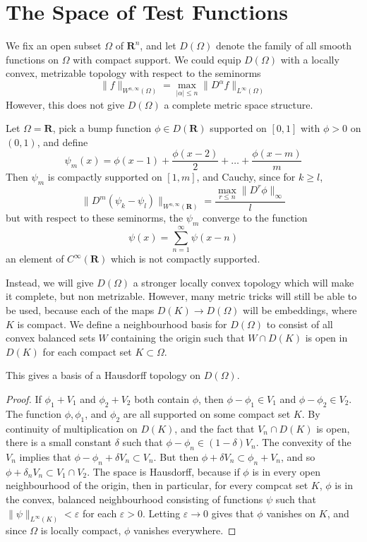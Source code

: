 \section{The Space of Test Functions}

We fix an open subset $\Omega$ of $\mathbf{R}^n$, and let $D(\Omega)$ denote the family of all smooth functions on $\Omega$ with compact support. We could equip $D(\Omega)$ with a locally convex, metrizable topology with respect to the seminorms
%
\[ \| f \|_{W^{n,\infty}(\Omega)} = \max_{|\alpha| \leq n} \| D^\alpha f \|_{L^\infty(\Omega)} \]
%
However, this does not give $D(\Omega)$ a complete metric space structure.

\begin{example}
    Let $\Omega = \mathbf{R}$, pick a bump function $\phi \in D(\mathbf{R})$ supported on $[0,1]$ with $\phi > 0$ on $(0,1)$, and define
    \[ \psi_m(x) = \phi(x-1) + \frac{\phi(x-2)}{2} + \dots + \frac{\phi(x-m)}{m} \]
    Then $\psi_m$ is compactly supported on $[1,m]$, and Cauchy, since for $k \geq l$,
    \[ \| D^m (\psi_k - \psi_l) \|_{W^{n,\infty}(\mathbf{R})} = \frac{ \max_{r \leq n} \| D^r \phi \|_\infty}{l} \]
    but with respect to these seminorms, the $\psi_m$ converge to the function
    \[ \psi(x) = \sum_{n = 1}^\infty \psi(x-n) \]
    an element of $C^\infty(\mathbf{R})$ which is not compactly supported.
\end{example}

Instead, we will give $D(\Omega)$ a stronger locally convex topology which will make it complete, but non metrizable. However, many metric tricks will still be able to be used, because each of the maps $D(K) \to D(\Omega)$ will be embeddings, where $K$ is compact. We define a neighbourhood basis for $D(\Omega)$ to consist of all convex balanced sets $W$ containing the origin such that $W \cap D(K)$ is open in $D(K)$ for each compact set $K \subset \Omega$.

\begin{theorem}
    This gives a basis of a Hausdorff topology on $D(\Omega)$.
\end{theorem}
\begin{proof}
    If $\phi_1 + V_1$ and $\phi_2 + V_2$ both contain $\phi$, then $\phi - \phi_1 \in V_1$ and $\phi - \phi_2 \in V_2$. The function $\phi, \phi_1$, and $\phi_2$ are all supported on some compact set $K$. By continuity of multiplication on $D(K)$, and the fact that $V_n \cap D(K)$ is open, there is a small constant $\delta$ such that $\phi - \phi_n \in (1 - \delta) V_n$. The convexity of the $V_n$ implies that $\phi - \phi_n + \delta V_n \subset V_n$. But then $\phi + \delta V_n \subset \phi_n + V_n$, and so $\phi + \delta_n V_n \subset V_1 \cap V_2$. The space is Hausdorff, because if $\phi$ is in every open neighbourhood of the origin, then in particular, for every compcat set $K$, $\phi$ is in the convex, balanced neighbourhood consisting of functions $\psi$ such that $\| \psi \|_{L^\infty(K)} < \varepsilon$ for each $\varepsilon > 0$. Letting $\varepsilon \to 0$ gives that $\phi$ vanishes on $K$, and since $\Omega$ is locally compact, $\phi$ vanishes everywhere.
\end{proof}

